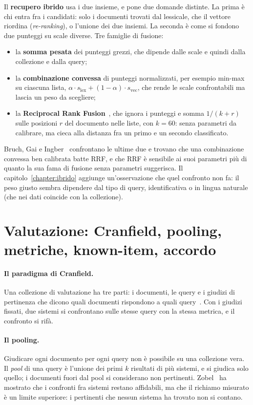 Il \textbf{recupero ibrido} usa i due insieme, e pone due domande distinte. La
prima è chi entra fra i candidati: solo i documenti trovati dal lessicale, che il
vettore riordina (\emph{re-ranking}), o l'unione dei due insiemi. La seconda è
come si fondono due punteggi su scale diverse. Tre famiglie di fusione:
\begin{itemize}
  \item la \textbf{somma pesata} dei punteggi grezzi, che dipende dalle scale e
        quindi dalla collezione e dalla query;
  \item la \textbf{combinazione convessa} di punteggi normalizzati, per esempio
        min-max su ciascuna lista, $\alpha \cdot s_\text{lex} + (1 - \alpha)
        \cdot s_\text{vec}$, che rende le scale confrontabili ma lascia un peso da
        scegliere;
  \item la \textbf{Reciprocal Rank Fusion}~\cite{cormack2009rrf}, che ignora i
        punteggi e somma $1/(k + r)$ sulle posizioni $r$ del documento nelle
        liste, con $k = 60$: senza parametri da calibrare, ma cieca alla distanza
        fra un primo e un secondo classificato.
\end{itemize}
Bruch, Gai e Ingber~\cite{bruch2023fusion} confrontano le ultime due e trovano
che una combinazione convessa ben calibrata batte RRF, e che RRF è sensibile ai
suoi parametri più di quanto la sua fama di fusione senza parametri suggerisca. Il capitolo~\ref{chapter:ibrido}
aggiunge un'osservazione che quel confronto non fa: il peso giusto sembra dipendere dal
tipo di query, identificativa o in lingua naturale (che nei dati coincide con la collezione).

\section{Valutazione: Cranfield, pooling, metriche, known-item, accordo}\label{sec:valutazione-teoria}

\paragraph{Il paradigma di Cranfield.} Una collezione di valutazione ha tre
parti: i documenti, le query e i giudizi di pertinenza che dicono quali documenti
rispondono a quali query~\cite{cleverdon1967}. Con i giudizi fissati, due sistemi
si confrontano sulle stesse query con la stessa metrica, e il confronto si rifà.

\paragraph{Il pooling.} Giudicare ogni documento per ogni query non è possibile su
una collezione vera. Il \emph{pool} di una query è l'unione dei primi $k$
risultati di più sistemi, e si giudica solo quello; i documenti fuori dal pool si
considerano non pertinenti. Zobel~\cite{zobel1998pooling} ha mostrato che i
confronti fra sistemi restano affidabili, ma che il richiamo misurato è un limite
superiore: i pertinenti che nessun sistema ha trovato non si contano.

